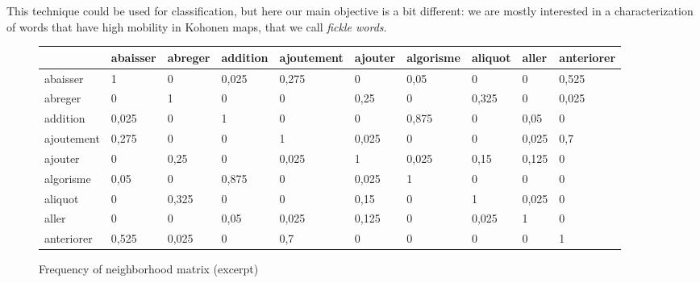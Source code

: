 \documentclass[preprint]{elsarticle}
\begin{document}
This technique could be used for classification, but here our main objective is a bit different: we are mostly interested in a characterization of words that have high mobility in Kohonen maps, that we call \textit{fickle words}.

\label{m1}

\begin{figure}
\begin{small}
\begin{tabular}{|l|l|l|l|l|l|l|l|l|l|}
\hline
 & abaisser & abreger & addition & ajoutement & ajouter & algorisme & aliquot & aller & anteriorer \\ \hline
abaisser  & \cellcolor{gris} 1 & 0 & \cellcolor{grisclair} 0,025 & \cellcolor{gris} 0,275 & 0 & \cellcolor{grisclair} 0,05 & 0 & 0 & \cellcolor{gris} 0,525\\ \hline
abreger & 0 & \cellcolor{gris} 1 & 0 & 0 & \cellcolor{gris} 0,25 & 0 & \cellcolor{gris} 0,325 & 0 & \cellcolor{grisclair} 0,025\\ \hline
addition & \cellcolor{grisclair} 0,025 & 0 & \cellcolor{gris} 1 & 0 & 0 & \cellcolor{gris} 0,875 & 0 & \cellcolor{grisclair} 0,05 & 0\\ \hline
ajoutement  & \cellcolor{gris} 0,275 & 0 & 0 & \cellcolor{gris} 1 & \cellcolor{grisclair} 0,025 & 0 & 0 & \cellcolor{grisclair} 0,025 & \cellcolor{gris} 0,7\\ \hline
ajouter & 0 & \cellcolor{gris} 0,25 & 0 & \cellcolor{grisclair} 0,025 & \cellcolor{gris} 1 & \cellcolor{grisclair} 0,025 & \cellcolor{grisclair} 0,15 & \cellcolor{grisclair} 0,125 & 0\\ \hline
algorisme & \cellcolor{grisclair} 0,05 & 0 & \cellcolor{gris} 0,875 & 0 & \cellcolor{grisclair} 0,025 & \cellcolor{gris} 1 & 0 & 0 & 0\\ \hline
aliquot & 0 & \cellcolor{gris} 0,325 & 0 & 0 & \cellcolor{grisclair} 0,15 & 0 & \cellcolor{gris} 1 & \cellcolor{grisclair} 0,025 & 0\\ \hline
aller & 0 & 0 & \cellcolor{grisclair} 0,05 & \cellcolor{grisclair} 0,025 & \cellcolor{grisclair} 0,125 & 0 & \cellcolor{grisclair} 0,025 & \cellcolor{gris} 1 & 0\\ \hline
anteriorer & \cellcolor{gris} 0,525 & \cellcolor{grisclair} 0,025 & 0 & \cellcolor{gris} 0,7 & 0 & 0 & 0 & 0 & \cellcolor{gris} 1 \\ \hline
\end{tabular}
\end{small}
\caption{Frequency of neighborhood matrix (excerpt)}
\label{bertin1}
\end{figure}
\end{document}
